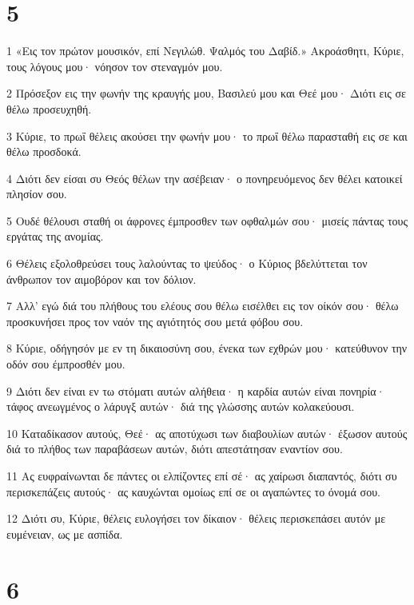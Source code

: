 \chapter{5}

\par 1 «Εις τον πρώτον μουσικόν, επί Νεγιλώθ. Ψαλμός του Δαβίδ.» Ακροάσθητι, Κύριε, τους λόγους μου· νόησον τον στεναγμόν μου.
\par 2 Πρόσεξον εις την φωνήν της κραυγής μου, Βασιλεύ μου και Θεέ μου· Διότι εις σε θέλω προσευχηθή.
\par 3 Κύριε, το πρωΐ θέλεις ακούσει την φωνήν μου· το πρωΐ θέλω παρασταθή εις σε και θέλω προσδοκά.
\par 4 Διότι δεν είσαι συ Θεός θέλων την ασέβειαν· ο πονηρευόμενος δεν θέλει κατοικεί πλησίον σου.
\par 5 Ουδέ θέλουσι σταθή οι άφρονες έμπροσθεν των οφθαλμών σου· μισείς πάντας τους εργάτας της ανομίας.
\par 6 Θέλεις εξολοθρεύσει τους λαλούντας το ψεύδος· ο Κύριος βδελύττεται τον άνθρωπον τον αιμοβόρον και τον δόλιον.
\par 7 Αλλ' εγώ διά του πλήθους του ελέους σου θέλω εισέλθει εις τον οίκόν σου· θέλω προσκυνήσει προς τον ναόν της αγιότητός σου μετά φόβου σου.
\par 8 Κύριε, οδήγησόν με εν τη δικαιοσύνη σου, ένεκα των εχθρών μου· κατεύθυνον την οδόν σου έμπροσθέν μου.
\par 9 Διότι δεν είναι εν τω στόματι αυτών αλήθεια· η καρδία αυτών είναι πονηρία· τάφος ανεωγμένος ο λάρυγξ αυτών· διά της γλώσσης αυτών κολακεύουσι.
\par 10 Καταδίκασον αυτούς, Θεέ· ας αποτύχωσι των διαβουλίων αυτών· έξωσον αυτούς διά το πλήθος των παραβάσεων αυτών, διότι απεστάτησαν εναντίον σου.
\par 11 Ας ευφραίνωνται δε πάντες οι ελπίζοντες επί σέ· ας χαίρωσι διαπαντός, διότι συ περισκεπάζεις αυτούς· ας καυχώνται ομοίως επί σε οι αγαπώντες το όνομά σου.
\par 12 Διότι συ, Κύριε, θέλεις ευλογήσει τον δίκαιον· θέλεις περισκεπάσει αυτόν με ευμένειαν, ως με ασπίδα.

\chapter{6}

